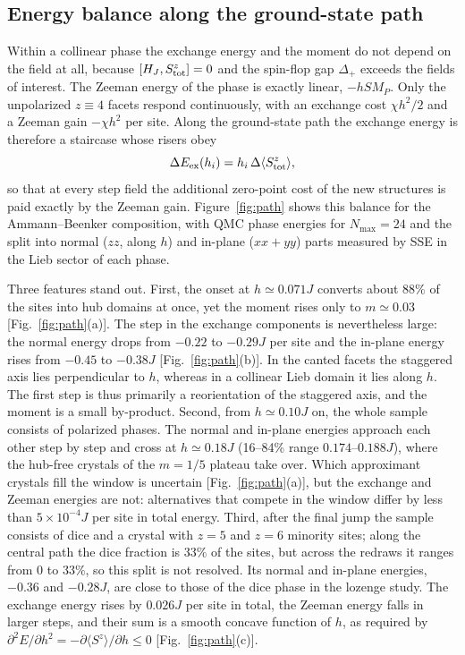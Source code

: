 \documentclass[aps,prb,twocolumn,superscriptaddress,floatfix]{revtex4-2}
\begin{document}
\subsection{Energy balance along the ground-state path}

Within a collinear phase the exchange energy and the moment do not depend on the field at all, because $[H_J,S^z_{\rm tot}]=0$ and the spin-flop gap $\Delta_+$ exceeds the fields of interest. The Zeeman energy of the phase is exactly linear, $-hSM_P$. Only the unpolarized $z\equiv4$ facets respond continuously, with an exchange cost $\chi h^2/2$ and a Zeeman gain $-\chi h^2$ per site. Along the ground-state path the exchange energy is therefore a staircase whose risers obey
\begin{equation}
\Delta E_{\rm ex}(h_i)=h_i\,\Delta\langle S^z_{\rm tot}\rangle ,
\label{eq:balance}
\end{equation}
so that at every step field the additional zero-point cost of the new structures is paid exactly by the Zeeman gain. Figure~\ref{fig:path} shows this balance for the Ammann--Beenker composition, with QMC phase energies for $N_{\max}=24$ and the split into normal ($zz$, along $h$) and in-plane ($xx+yy$) parts measured by SSE in the Lieb sector of each phase.

Three features stand out. First, the onset at $h\simeq0.071J$ converts about $88\%$ of the sites into hub domains at once, yet the moment rises only to $m\simeq0.03$ [Fig.~\ref{fig:path}(a)]. The step in the exchange components is nevertheless large: the normal energy drops from $-0.22$ to $-0.29J$ per site and the in-plane energy rises from $-0.45$ to $-0.38J$ [Fig.~\ref{fig:path}(b)]. In the canted facets the staggered axis lies perpendicular to $h$, whereas in a collinear Lieb domain it lies along $h$. The first step is thus primarily a reorientation of the staggered axis, and the moment is a small by-product. Second, from $h\simeq0.10J$ on, the whole sample consists of polarized phases. The normal and in-plane energies approach each other step by step and cross at $h\simeq0.18J$ (16--84\% range $0.174$--$0.188J$), where the hub-free crystals of the $m=1/5$ plateau take over. Which approximant crystals fill the window is uncertain [Fig.~\ref{fig:path}(a)], but the exchange and Zeeman energies are not: alternatives that compete in the window differ by less than $5\times10^{-4}J$ per site in total energy. Third, after the final jump the sample consists of dice and a crystal with $z=5$ and $z=6$ minority sites; along the central path the dice fraction is $33\%$ of the sites, but across the redraws it ranges from $0$ to $33\%$, so this split is not resolved. Its normal and in-plane energies, $-0.36$ and $-0.28J$, are close to those of the dice phase in the lozenge study. The exchange energy rises by $0.026J$ per site in total, the Zeeman energy falls in larger steps, and their sum is a smooth concave function of $h$, as required by $\partial^2E/\partial h^2=-\partial\langle S^z\rangle/\partial h\le0$ [Fig.~\ref{fig:path}(c)].
\end{document}
